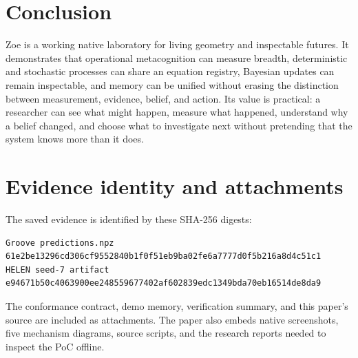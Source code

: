 \documentclass[11pt,a4paper]{article}
\begin{document}
\section{Conclusion}
Zoe is a working native laboratory for living geometry and inspectable futures. It demonstrates that operational metacognition can measure breadth, deterministic and stochastic processes can share an equation registry, Bayesian updates can remain inspectable, and memory can be unified without erasing the distinction between measurement, evidence, belief, and action. Its value is practical: a researcher can see what might happen, measure what happened, understand why a belief changed, and choose what to investigate next without pretending that the system knows more than it does.

\appendix
\section{Evidence identity and attachments}
The saved evidence is identified by these SHA-256 digests:
\begin{lstlisting}
Groove predictions.npz
61e2be13296cd306cf9552840b1f0f51eb9ba02fe6a7777d0f5b216a8d4c51c1
HELEN seed-7 artifact
e94671b50c4063900ee248559677402af602839edc1349bda70eb16514de8da9
\end{lstlisting}
The conformance contract, demo memory, verification summary, and this paper's source are included as attachments. The paper also embeds native screenshots, five mechanism diagrams, source scripts, and the research reports needed to inspect the PoC offline.
\end{document}

